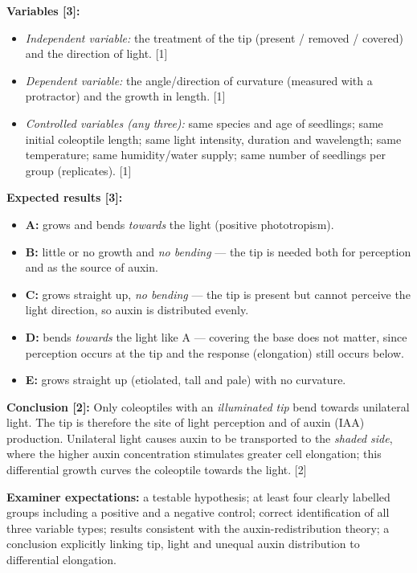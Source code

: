 \documentclass[11pt]{article}
\begin{document}
\begin{corrige}
\textbf{Variables [3]:}
\begin{itemize}
\item \emph{Independent variable:} the treatment of the tip (present / removed / covered) and the direction of light. [1]
\item \emph{Dependent variable:} the angle/direction of curvature (measured with a protractor) and the growth in length. [1]
\item \emph{Controlled variables (any three):} same species and age of seedlings; same initial coleoptile length; same light intensity, duration and wavelength; same temperature; same humidity/water supply; same number of seedlings per group (replicates). [1]
\end{itemize}

\textbf{Expected results [3]:}
\begin{itemize}
\item \textbf{A:} grows and bends \emph{towards} the light (positive phototropism).
\item \textbf{B:} little or no growth and \emph{no bending} — the tip is needed both for perception and as the source of auxin.
\item \textbf{C:} grows straight up, \emph{no bending} — the tip is present but cannot perceive the light direction, so auxin is distributed evenly.
\item \textbf{D:} bends \emph{towards} the light like A — covering the base does not matter, since perception occurs at the tip and the response (elongation) still occurs below.
\item \textbf{E:} grows straight up (etiolated, tall and pale) with no curvature.
\end{itemize}

\textbf{Conclusion [2]:} Only coleoptiles with an \emph{illuminated tip} bend towards unilateral light. The tip is therefore the site of light perception and of auxin (IAA) production. Unilateral light causes auxin to be transported to the \emph{shaded side}, where the higher auxin concentration stimulates greater cell elongation; this differential growth curves the coleoptile towards the light. [2]

\textbf{Examiner expectations:} a testable hypothesis; at least four clearly labelled groups including a positive and a negative control; correct identification of all three variable types; results consistent with the auxin-redistribution theory; a conclusion explicitly linking tip, light and unequal auxin distribution to differential elongation.
\end{corrige}
\end{document}
